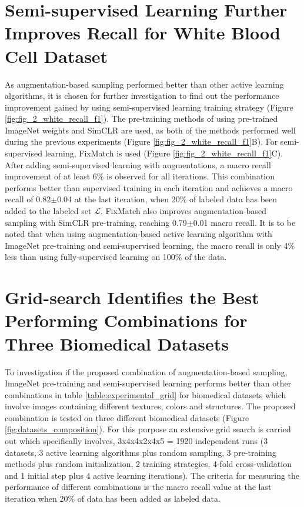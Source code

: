 \section{Semi-supervised Learning Further Improves Recall for White Blood Cell Dataset}
As augmentation-based sampling performed better than other active learning algorithms, it is chosen for further investigation to find out the performance improvement gained by using semi-supervised learning training strategy (Figure \ref{fig:fig_2_white_recall_f1}). The pre-training methods of using pre-trained ImageNet weights and SimCLR are used, as both of the methods performed well during the previous experiments (Figure \ref{fig:fig_2_white_recall_f1}B). For semi-supervised learning, FixMatch is used (Figure \ref{fig:fig_2_white_recall_f1}C). After adding semi-supervised learning with augmentations, a macro recall improvement of at least 6\% is observed for all iterations. This combination performs better than supervised training in each iteration and achieves a macro recall of 0.82$\pm$0.04 at the last iteration, when 20\% of labeled data has been added to the labeled set $\mathcal{L}$. FixMatch also improves augmentation-based sampling with SimCLR pre-training, reaching 0.79$\pm$0.01 macro recall. It is to be noted that when using augmentation-based active learning algorithm with ImageNet pre-training and semi-supervised learning, the macro recall is only 4\% less than using fully-supervised learning on 100\% of the data.

\section{Grid-search Identifies the Best Performing Combinations for Three Biomedical Datasets}
To investigation if the proposed combination of augmentation-based sampling, ImageNet pre-training and semi-supervised learning performs better than other combinations in table \ref{table:experimental_grid} for biomedical datasets which involve images containing different textures, colors and structures. The proposed combination is tested on three different biomedical datasets (Figure \ref{fig:datasets_composition}). For this purpose an extensive grid search is carried out which specifically involves, 3x4x4x2x4x5 = 1920 independent runs (3 datasets, 3 active learning algorithms plus random sampling, 3 pre-training methods plus random initialization, 2 training strategies, 4-fold cross-validation and 1 initial step plus 4 active learning iterations). The criteria for measuring the performance of different combinations is the macro recall value at the last iteration when 20\% of data has been added as labeled data.

